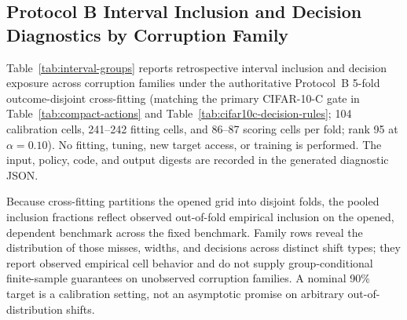 \begin{table}[!t]
\centering
\scriptsize
\caption{Retrospective current-policy sensitivity over six observed CIFAR-10-C corruption families.
Each cell reports baseline regret minus KGA regret and a nominal, unadjusted 95\% family-bootstrap
interval; positive values favor KGA. Holm values adjust retrospective sign-flip reference values over six
prospectively named candidate-by-baseline contrasts. The replay, corruption-family unit, sign-flip
test, and Holm adjustment were not preregistered. The within-Tent two-contrast Holm value is
$0.03125$ but is post hoc. This table is conditional on one archived checkpoint and does not provide
verified finite-sample coverage, simultaneous intervals, independent-checkpoint inference,
prospective confirmation, natural-shift
evidence, or official POEM/AETTA superiority.}
\label{tab:compact-current-family}
\resizebox{\textwidth}{!}{}
\end{table}

\subsection{Protocol B Interval Inclusion and Decision Diagnostics by Corruption Family}
\label{app:interval-groups}

Table~\ref{tab:interval-groups} reports retrospective interval inclusion and decision exposure across corruption families under the authoritative Protocol~B 5-fold outcome-disjoint cross-fitting (matching the primary CIFAR-10-C gate in Table~\ref{tab:compact-actions} and Table~\ref{tab:cifar10c-decision-rules}; 104 calibration cells, 241--242 fitting cells, and 86--87 scoring cells per fold; rank 95 at $\alpha=0.10$). No fitting, tuning, new target access, or training is performed. The input, policy, code, and output digests are recorded in the generated diagnostic JSON.

Because cross-fitting partitions the opened grid into disjoint folds, the pooled inclusion fractions reflect observed out-of-fold empirical inclusion on the opened, dependent benchmark across the fixed benchmark. Family rows reveal the distribution of those misses, widths, and decisions across distinct shift types; they report observed empirical cell behavior and do not supply group-conditional finite-sample guarantees on unobserved corruption families. A nominal 90\% target is a calibration setting, not an asymptotic promise on arbitrary out-of-distribution shifts.

